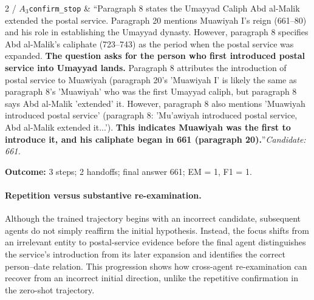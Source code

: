 \begin{longtable}
2 / $A_3$\newline \texttt{confirm\_stop} & ``Paragraph 8 states the Umayyad Caliph Abd al-Malik extended the postal service. Paragraph 20 mentions Muawiyah I's reign (661--80) and his role in establishing the Umayyad dynasty. However, paragraph 8 specifies Abd al-Malik's caliphate (723--743) as the period when the postal service was expanded. \textbf{The question asks for the person who first introduced postal service into Umayyad lands.} Paragraph 8 attributes the introduction of postal service to Muawiyah (paragraph 20's 'Muawiyah I' is likely the same as paragraph 8's 'Muawiyah' who was the first Umayyad caliph, but paragraph 8 says Abd al-Malik 'extended' it. However, paragraph 8 also mentions 'Muawiyah introduced postal service' (paragraph 8: 'Mu'awiyah introduced postal service, Abd al-Malik extended it...'). \textbf{This indicates Muawiyah was the first to introduce it, and his caliphate began in 661 (paragraph 20).}''\newline \textit{Candidate: 661.} \\
\end{longtable}
\noindent\textbf{Outcome:} 3 steps; 2 handoffs; final answer 661; EM = 1, F1 = 1.
\par\endgroup

\begingroup
\setlength{\fboxsep}{7pt}
\endgroup

\paragraph{Repetition versus substantive re-examination.}
Although the trained trajectory begins with an incorrect candidate, subsequent agents do not simply reaffirm the initial hypothesis. Instead, the focus shifts from an irrelevant entity to postal-service evidence before the final agent distinguishes the service's introduction from its later expansion and identifies the correct person--date relation. This progression shows how cross-agent re-examination can recover from an incorrect initial direction, unlike the repetitive confirmation in the zero-shot trajectory.

